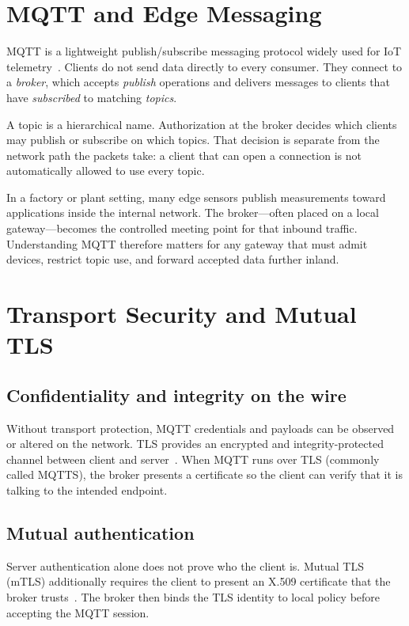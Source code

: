 \documentclass[12pt,a4paper]{report}
\begin{document}
\section{MQTT and Edge Messaging}

MQTT is a lightweight publish/subscribe messaging
protocol widely used for IoT telemetry~\cite{mqtt}.
Clients do not send data directly to every consumer.
They connect to a \emph{broker}, which accepts
\emph{publish} operations and delivers messages to
clients that have \emph{subscribed} to matching
\emph{topics}.

A topic is a hierarchical name. Authorization at
the broker decides which clients may publish or
subscribe on which topics. That decision is separate
from the network path the packets take: a client that
can open a connection is not automatically allowed to
use every topic.

In a factory or plant setting, many edge sensors publish
measurements toward applications inside the internal
network. The broker---often placed on a local
gateway---becomes the controlled meeting point for that
inbound traffic. Understanding MQTT therefore matters
for any gateway that must admit devices, restrict topic
use, and forward accepted data further inland.

\section{Transport Security and Mutual TLS}

\subsection{Confidentiality and integrity on the wire}

Without transport protection, MQTT credentials and
payloads can be observed or altered on the network.
TLS provides an encrypted and integrity-protected
channel between client and server~\cite{tls}. When MQTT
runs over TLS (commonly called MQTTS), the broker
presents a certificate so the client can verify
that it is talking to the intended endpoint.

\subsection{Mutual authentication}

Server authentication alone does not prove who the
client is. Mutual TLS (mTLS) additionally requires the
client to present an X.509 certificate that the broker
trusts~\cite{x509}. The broker then binds the TLS
identity to local policy before accepting the MQTT
session.
\end{document}
